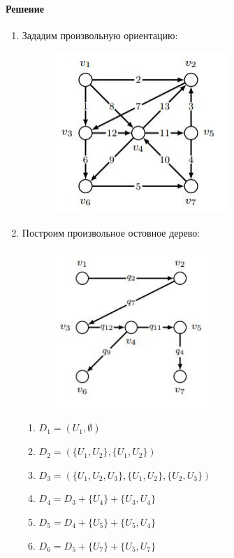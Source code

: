 \documentclass[a4paper, 12pt]{article}
\begin{document}
\paragraph{Решение}
\begin{enumerate}
    \item Зададим произвольную ориентацию:
    \begin{figure}[h]
        \includegraphics{6_orgraph}
    \end{figure}
    \item Построим произвольное остовное дерево:
    \begin{figure}[h]
        \includegraphics{6_tree}
    \end{figure}
    \begin{enumerate}[label*=\arabic*.]
        \item $ D_1 = (U_1, \emptyset) $
        \item $ D_2 = (\{U_{ 1}, U_{ 2}\}, \{U_{ 1}, U_{ 2}\})$
        \item $ D_3 = (\{U_{ 1}, U_{ 2}, U_{ 3}\}, \{U_{ 1}, U_{ 2}\}, \{U_{ 2}, U_{ 3}\})$
        \newpage
        \item $ D_4 = D_3 + \{U_{ 4}\} + \{U_{ 3}, U_{ 4}\} $
        \item $ D_5 = D_4 + \{U_{ 5}\} + \{U_{ 5}, U_{ 4}\} $
        \item $ D_6 = D_5 + \{U_{ 7}\} + \{U_{ 5}, U_{ 7}\} $

\end{enumerate}
\end{enumerate}
\end{document}
